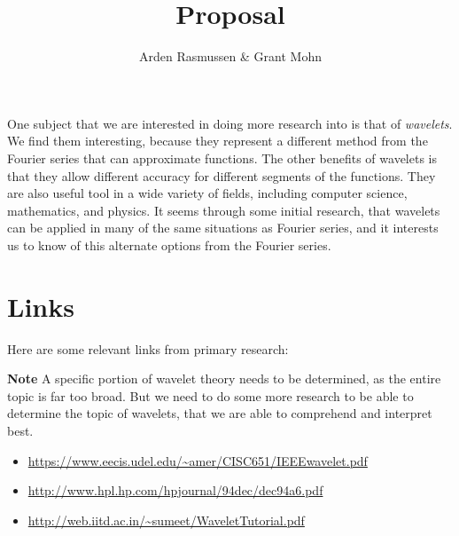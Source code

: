\documentclass[10pt]{article}
\title{Proposal}
\author{Arden Rasmussen & Grant Mohn}
\begin{document}
\maketitle
One subject that we are interested in doing more research into is that of
\textit{wavelets}. We find them interesting, because they represent a different
method from the Fourier series that can approximate functions. The other
benefits of wavelets is that they allow different accuracy for different
segments of the functions. They are also useful tool in a wide variety of
fields, including computer science, mathematics, and physics. It seems through
some initial research, that wavelets can be applied in many of the same
situations as Fourier series, and it interests us to know of this alternate
options from the Fourier series.

\section{Links}%
\label{sec:links}

Here are some relevant links from primary research:

\textbf{Note} A specific portion of wavelet theory needs to be determined, as
the entire topic is far too broad. But we need to do some more research to be
able to determine the topic of wavelets, that we are able to comprehend and
interpret best.
\begin{itemize}
  \item \url{https://www.eecis.udel.edu/~amer/CISC651/IEEEwavelet.pdf}
  \item \url{http://www.hpl.hp.com/hpjournal/94dec/dec94a6.pdf}
  \item \url{http://web.iitd.ac.in/~sumeet/WaveletTutorial.pdf}
\end{itemize}
\end{document}
